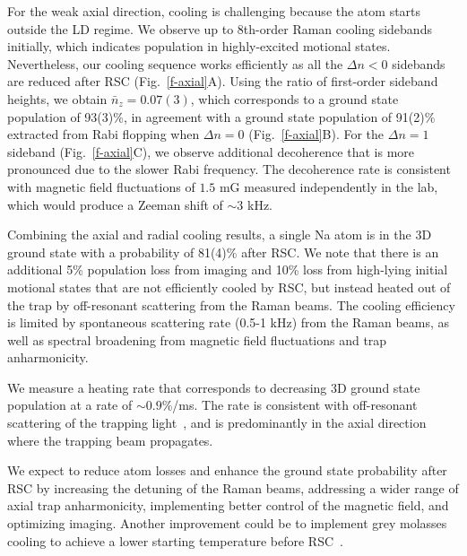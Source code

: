 \documentclass[aps,prl,twocolumn,groupedaddress]{revtex4-1}
\begin{document}
For the weak axial direction, cooling is challenging because the atom starts outside the LD regime.
We observe up to 8th-order Raman cooling sidebands initially,
which indicates population in highly-excited motional states.
Nevertheless, our cooling sequence works efficiently as all the $\Delta n<0$ sidebands are reduced
after RSC (Fig.~\ref{f-axial}A).
Using the ratio of first-order sideband heights, we obtain $\bar{n}_z=0.07(3)$, which corresponds to a ground state population of
93(3)\%, in agreement with a ground state population of 91(2)\% extracted from Rabi flopping
when $\Delta n=0$ (Fig.~\ref{f-axial}B).
For the $\Delta n=1$ sideband (Fig.~\ref{f-axial}C),
we observe additional decoherence that is more pronounced due to the slower Rabi frequency.
The decoherence rate is consistent with magnetic field fluctuations of $1.5$ mG measured independently in the lab, which would produce a Zeeman shift of $\sim 3$ kHz.

Combining the axial and radial cooling results,
 a single Na atom is in the 3D ground state with a probability of 81(4)\% after RSC.
 We note that there is an additional 5\% population loss from imaging and 10\% loss
from high-lying initial motional states that are not efficiently cooled by RSC,
but instead heated out of the trap by off-resonant scattering from the Raman beams.
The cooling efficiency is limited by spontaneous scattering rate (0.5-1 kHz) from the Raman beams, as well as spectral broadening from magnetic field fluctuations and trap anharmonicity.


We measure a heating rate that corresponds to decreasing 3D ground state population at a rate of $\sim0.9$\%/ms.
The rate is consistent with off-resonant scattering of the trapping light~\cite{Grimm2000}, and is predominantly in the axial direction where the trapping beam propagates.


We expect to reduce atom losses and enhance the ground state probability after RSC
by increasing the detuning of the Raman beams,
addressing a wider range of axial trap anharmonicity, %
implementing better control of the magnetic field, and optimizing imaging.
Another improvement could be to implement grey molasses cooling to achieve
a lower starting temperature before RSC~\cite{Colzi2016}.
\end{document}
